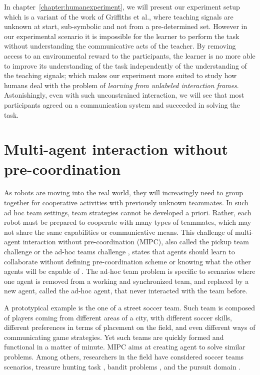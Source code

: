In chapter~\ref{chapter:humanexperiment}, we will present our experiment setup which is a variant of the work of Griffiths et al., where teaching signals are unknown at start, sub-symbolic and not from a pre-determined set. However in our experimental scenario it is impossible for the learner to perform the task without understanding the communicative acts of the teacher. By removing access to an environmental reward to the participants, the learner is no more able to improve its understanding of the task independently of the understanding of the teaching signals; which makes our experiment more suited to study how humans deal with the problem of \emph{learning from unlabeled interaction frames}. Astonishingly, even with such unconstrained interaction, we will see that most participants agreed on a communication system and succeeded in solving the task.

\section{Multi-agent interaction without pre-coordination}

As robots are moving into the real world, they will increasingly need to group together for cooperative activities with previously unknown teammates. In such ad hoc team settings, team strategies cannot be developed a priori. Rather, each robot must be prepared to cooperate with many types of teammates, which may not share the same capabilities or communicative means. This challenge of multi-agent interaction without pre-coordination (MIPC), also called the pickup team challenge \cite{gil2006dynamically} or the ad-hoc teams challenge \cite{stone2010ad}, states that agents should learn to collaborate without defining pre-coordination scheme or knowing what the other agents will be capable of \cite{bowling2005coordination,gil2006dynamically,stone2010ad}. The ad-hoc team problem \cite{stone2010ad} is specific to scenarios where one agent is removed from a working and synchronized team, and replaced by a new agent, called the ad-hoc agent, that never interacted with the team before.

A prototypical example is the one of a street soccer team. Such team is composed of players coming from different areas of a city, with different soccer skills, different preferences in terms of placement on the field, and even different ways of communicating game strategies. Yet such teams are quickly formed and functional in a matter of minute. MIPC aims at creating agent to solve similar problems. Among others, researchers in the field have considered soccer teams scenarios\cite{bowling2005coordination}, treasure hunting task \cite{gil2006dynamically}, bandit problems \cite{barrett2013communicating}, and the pursuit domain \cite{barrett2011empirical}.


